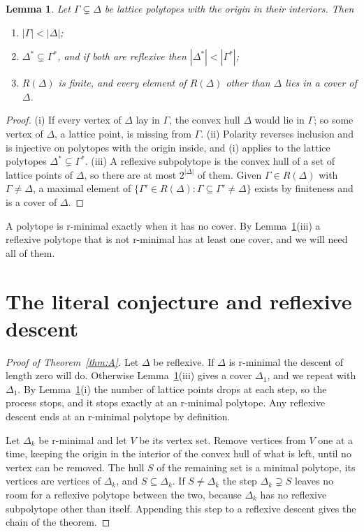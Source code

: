 \documentclass[11pt]{amsart}
\newtheorem{lemma}[theorem]{Lemma}
\theoremstyle{definition}
\theoremstyle{remark}
\begin{document}
\begin{lemma}\label{lem:basic}
Let $\Gamma\subsetneq\Delta$ be lattice polytopes with the origin in their
interiors. Then
\begin{enumerate}[label=\textup{(\roman*)},leftmargin=*]
\item $|\Gamma|<|\Delta|$;
\item $\Delta^*\subsetneq\Gamma^*$, and if both are reflexive then
$|\Delta^*|<|\Gamma^*|$;
\item $R(\Delta)$ is finite, and every element of $R(\Delta)$ other than
$\Delta$ lies in a cover of $\Delta$.
\end{enumerate}
\end{lemma}

\begin{proof}
(i) If every vertex of $\Delta$ lay in $\Gamma$, the convex hull $\Delta$
would lie in $\Gamma$; so some vertex of $\Delta$, a lattice point, is
missing from $\Gamma$. (ii) Polarity reverses inclusion and is injective
on polytopes with the origin inside, and (i) applies to the lattice
polytopes $\Delta^*\subsetneq\Gamma^*$. (iii) A reflexive subpolytope is
the convex hull of a set of lattice points of $\Delta$, so there are at
most $2^{|\Delta|}$ of them. Given $\Gamma\in R(\Delta)$ with
$\Gamma\ne\Delta$, a maximal element of
$\{\Gamma'\in R(\Delta):\Gamma\subseteq\Gamma'\ne\Delta\}$ exists by
finiteness and is a cover of $\Delta$.
\end{proof}

A polytope is r-minimal exactly when it has no cover. By
Lemma~\ref{lem:basic}(iii) a reflexive polytope that is not r-minimal has
at least one cover, and we will need all of them.

\section{The literal conjecture and reflexive descent}\label{sec:literal}

\begin{proof}[Proof of Theorem~\ref{thm:A}]
Let $\Delta$ be reflexive. If $\Delta$ is r-minimal the descent of length
zero will do. Otherwise Lemma~\ref{lem:basic}(iii) gives a cover
$\Delta_1$, and we repeat with $\Delta_1$. By Lemma~\ref{lem:basic}(i) the
number of lattice points drops at each step, so the process stops, and it
stops exactly at an r-minimal polytope. Any reflexive descent ends at an
r-minimal polytope by definition.

Let $\Delta_k$ be r-minimal and let $V$ be its vertex set. Remove vertices
from $V$ one at a time, keeping the origin in the interior of the convex
hull of what is left, until no vertex can be removed. The hull $S$ of the
remaining set is a minimal polytope, its vertices are vertices of
$\Delta_k$, and $S\subseteq\Delta_k$. If $S\ne\Delta_k$ the step
$\Delta_k\supsetneq S$ leaves no room for a reflexive polytope between the
two, because $\Delta_k$ has no reflexive subpolytope other than itself.
Appending this step to a reflexive descent gives the chain of the
theorem.
\end{proof}
\end{document}
